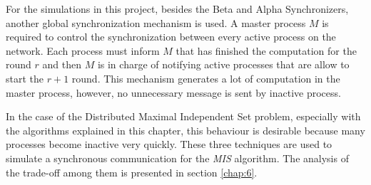 For the simulations in this project, besides the Beta and Alpha Synchronizers, another global synchronization mechanism is used. A master process $M$ is required to control the synchronization between every active process on the network.  Each process must inform $M$ that has finished the computation for the round $r$ and then $M$ is in charge of notifying active processes that are allow to start the $r + 1$ round. This mechanism generates a lot of computation in the master process, however, no unnecessary message is sent by inactive process. 

In the case of the Distributed Maximal Independent Set problem, especially with the algorithms explained in this chapter, this behaviour is desirable because many processes become inactive very quickly. These three techniques are used to simulate a synchronous communication for the \textit{MIS} algorithm. The analysis of the trade-off among them is presented in section \ref{chap:6}.




